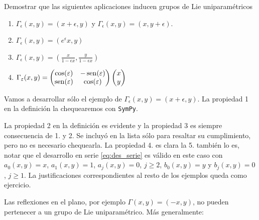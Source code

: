 \begin{ejemplo} Demostrar que las siguientes aplicaciones inducen grupos de Lie uniparamétricos
\begin{enumerate}
\item $\Gamma_{\epsilon}(x,y)=(x+\epsilon,y)$ y $\Gamma_{\epsilon}(x,y)=(x,y+\epsilon)$.
\item $\Gamma_{\epsilon}(x,y)=(e^{\epsilon}x,y)$
\item$\Gamma_{\epsilon}(x,y)=\left(\frac{x}{1-\epsilon x},\frac{y}{1-\epsilon x} \right)$
\item$\Gamma_{\varepsilon}(x,y)=\begin{pmatrix} \cos(\varepsilon) & -\operatorname{sen}(\varepsilon)
\\ \operatorname{sen}(\varepsilon) & \cos(\varepsilon)
\end{pmatrix} \begin{pmatrix} x\\ y
\end{pmatrix}
$
\end{enumerate}
\end{ejemplo}

Vamos a desarrollar sólo el ejemplo de $\Gamma_{\epsilon}(x,y)=(x+\epsilon,y)$. La propiedad 1 en la definición la chequearemos con  \texttt{SymPy}. 
 

 La propiedad 2 en la definición es evidente y la propiedad 3 es siempre consecuencia de 1. y 2. 
Se incluyó en la lista sólo para resaltar su cumplimiento, pero no es necesario chequearla. La propiedad 4. es clara la 5. también lo es, notar que el desarrollo en serie \eqref{eq:des_serie} es válido en este caso con $a_0(x,y)=x$, $a_1(x,y)=1$, $a_j(x,y)=0$, $j\geq 2$, $b_0(x,y)=y$ y $b_j(x,y)=0$, $j\geq 1$. La justificaciones correspondientes al resto de los ejemplos queda como ejercicio.\actividad


 Las reflexiones en el plano, por ejemplo $\Gamma(x,y)=(-x,y)$,  no pueden  pertenecer a un  grupo de Lie uniparamétrico. Más generalmente:
 
